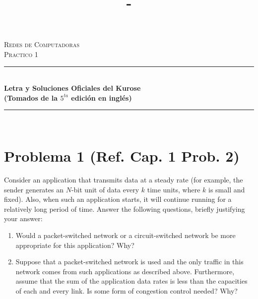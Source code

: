 \documentclass[10pt,spanish]{article}
\title{\Practico - \Titulo}
\newcommand{\Practico}{Practico 1}
\newcommand{\Titulo}{Letra y Soluciones Oficiales del Kurose}
\newcommand{\Materia}{Redes de Computadoras}
\numberwithin{figure}{section} %
\begin{document}
\vspace*{\fill}
\begin{center}																		%
\newcommand{\HRule}{\rule{\linewidth}{0.5mm}}							
\textsc{\huge \Materia}\\[1.5cm]	

\textsc{\huge \Practico				%
}\\[1.5cm]													%
\vspace*{5cm}																		%
\HRule \\[0.4cm]																	%
{ \huge \bfseries \Titulo \\ \Large(Tomados de la $5^{ta}$ edición en inglés)}\\[0.3cm]	%
\HRule \\[4cm]																	%
																		
\end{center}							 								\vspace*{\fill}		
																					
\newpage
\tableofcontents

\newpage
\section[Problema 1]{Problema 1 \textnormal{\Large{(Ref. Cap. 1 Prob. 2)}}}
Consider an application that transmits data at a steady rate (for example, the sender generates an $N$-bit unit of data every $k$ time units, where $k$ is small and fixed). Also, when such an application starts, it will continue running for a relatively long period of time. Answer the following questions, briefly justifying your answer:

\renewcommand{\theenumi}{\alph{enumi}} %
\begin{enumerate}
\item Would a packet-switched network or a circuit-switched network be more appropriate for this application? Why?
\item Suppose that a packet-switched network is used and the only traffic in this network comes from such applications as described above. Furthermore, assume that the sum of the application data rates is less than the capacities of each and every link. Is some form of congestion control needed? Why?
\end{enumerate}
\end{document}
